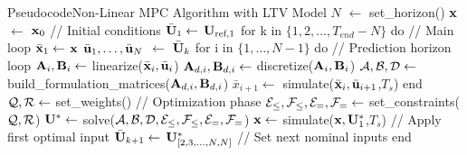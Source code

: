 \documentclass[../main.tex]{subfiles}
\begin{document}
\begin{codeblock}
\begin{code}{Pseudocode}{Non-Linear MPC Algorithm with LTV Model}
$N$ $\leftarrow$ set_horizon()
$\mathbf{x}$ $\leftarrow$ $\mathbf{x}_0$													 // Initial conditions
$\bar{\mathbf{U}}_{1} \leftarrow$ $\mathbf{U}_{\text{ref}, 1}$
for k in $\{1, 2, \ldots, T_{end} - N\}$ do			// Main loop
	$\bar{\mathbf{x}}_1 \leftarrow$ $\mathbf{x}$
	$\bar{\mathbf{u}}_1, \ldots, \bar{\mathbf{u}}_N$ $\leftarrow$ $\bar{\mathbf{U}}_{k}$
	for i in $\{1, \dots, N-1\}$ do				// Prediction horizon loop
		$\mathbf{A}_{i}, \mathbf{B}_{i} \leftarrow$ linearize($\bar{\mathbf{x}}_{i}, \bar{\mathbf{u}}_{i}$)
		$\mathbf{A}_{d,i}, \mathbf{B}_{d,i} \leftarrow$ discretize($\mathbf{A}_{i}, \mathbf{B}_{i}$)
		$\mathcal{A}, \mathcal{B}, \mathcal{D} \leftarrow$ build_formulation_matrices($\mathbf{A}_{d,i}, \mathbf{B}_{d,i}$)
		$\bar{x}_{i+1} \leftarrow$ simulate($\bar{\mathbf{x}}_{i},
		\bar{\mathbf{u}}_{i+1}$,$T_s$)
	end
	$\mathcal{Q}, \mathcal{R} \leftarrow$ set_weights()						// Optimization phase
	$\mathcal{E}_{\leq}, \mathcal{F}_{\leq}, \mathcal{E}_{=}, \mathcal{F}_{=} \leftarrow$
	set_constraints($\mathcal{Q}, \mathcal{R}$)
	$\mathbf{U}^* \leftarrow$ solve($\mathcal{A}, \mathcal{B}, \mathcal{D}, \mathcal{E}_{\leq}, \mathcal{F}_{\leq}, \mathcal{E}_{=}, \mathcal{F}_{=}$)	
	$\mathbf{x} \leftarrow$ simulate($\mathbf{x}, \mathbf{U}^*_1$,$T_s$)					 // Apply first optimal input
	$\bar{\mathbf{U}}_{k+1} \leftarrow$ $\mathbf{U}^*_{[2, 3, \ldots, N, N]}$								// Set next nominal inputs
end
\end{code}
\caption{Main steps of the implemented MPC algorithm. Notice that the algorithm
	runs up to $T_{end} - N$ since the prediction horizon cannot be applied to
times beyond this limit.}
\label{code:mpc}
\end{codeblock}
\end{document}
